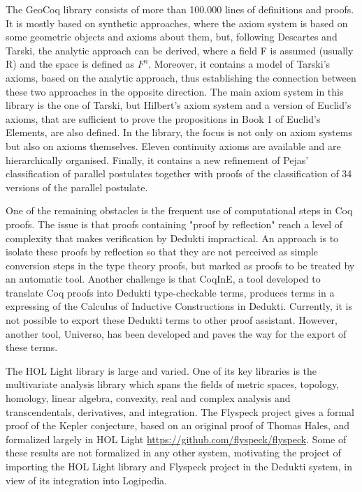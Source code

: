 \begin{workpackage}[id=libraries,type=RTD,wphases=1-48,
  short={Large libraries},%
  title={Large libraries},
  lead=Tum,
  StrRM=18,
  ChaRM=12,
  TumRM=27]
\begin{tasklist}
\begin{task}[
  id=geocoq,
  title=The GeoCoq library,
  lead=Str,
  StrRM=18,
  wphases=1-18]
%
The GeoCoq library consists of more than 100.000 lines of definitions
and proofs. It is mostly based on synthetic approaches, where the
axiom system is based on some geometric objects and axioms about them,
but, following Descartes and Tarski, the analytic approach can be
derived, where a field F is assumed (usually R) and the space is
defined as $F^n$. Moreover, it contains a model of Tarski's axioms,
based on the analytic approach, thus establishing the connection
between these two approaches in the opposite direction. The main axiom
system in this library is the one of Tarski, but Hilbert's axiom
system and a version of Euclid's axioms, that are sufficient to prove the
propositions in Book 1 of Euclid's Elements, are also defined. In the
library, the focus is not only on axiom systems but also on axioms
themselves. Eleven continuity axioms are available and are
hierarchically organised. Finally, it contains a new refinement of
Pejas’ classification of parallel postulates together with proofs of
the classification of 34 versions of the parallel postulate.

One of the remaining obstacles is the frequent use of computational steps in Coq proofs. The issue is that proofs containing "proof by reflection" reach a level of complexity that makes verification by Dedukti impractical. An approach is to isolate these proofs by reflection so that they are not perceived as simple conversion steps in the type theory proofs, but marked as proofs to be treated by an automatic tool. Another challenge is that CoqInE, a tool developed to translate Coq proofs into Dedukti type-checkable terms, produces terms in a expressing of the Calculus of Inductive Constructions in Dedukti. Currently, it is not possible to export these Dedukti terms to other proof assistant. However, another tool, Universo, has been developed and paves the way for the export of these terms.
\end{task}

\begin{task}[
  id=flyspeck,
  title=The Flyspeck library,
  lead=Inr,
  wphases=1-36]
The {HOL Light} library is large and varied. One of its key libraries is the
multivariate analysis library
which spans the fields of metric spaces, topology, homology, linear algebra,
convexity, real and complex analysis and transcendentals, derivatives, and
integration. The {Flyspeck} project gives a formal proof of the {Kepler}
conjecture, based on an original proof of Thomas {Hales}, and formalized
largely in {HOL Light} \url{https://github.com/flyspeck/flyspeck}.
Some of these results are not formalized in any other system, motivating the
project of importing the {HOL Light} library and {Flyspeck} project in the
{Dedukti} system, in view of its integration into {Logipedia}.


\end{task}
\end{tasklist}
\end{workpackage}
